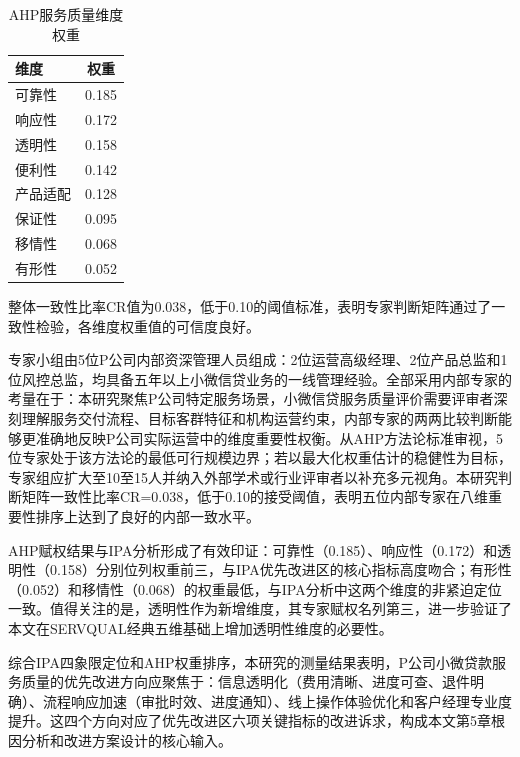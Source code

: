 \begin{table}[htbp]
  \centering
  \small
  \caption{AHP服务质量维度权重}
  \label{tab:4-ahp}
  \begin{tabular}{l c}
    \toprule
    \textbf{维度} & \textbf{权重} \\
    \midrule
    可靠性 & 0.185 \\
    响应性 & 0.172 \\
    透明性 & 0.158 \\
    便利性 & 0.142 \\
    产品适配 & 0.128 \\
    保证性 & 0.095 \\
    移情性 & 0.068 \\
    有形性 & 0.052 \\
    \bottomrule
  \end{tabular}
\end{table}

整体一致性比率CR值为0.038，低于0.10的阈值标准，表明专家判断矩阵通过了一致性检验，各维度权重值的可信度良好。\par

专家小组由5位P公司内部资深管理人员组成：2位运营高级经理、2位产品总监和1位风控总监，均具备五年以上小微信贷业务的一线管理经验。全部采用内部专家的考量在于：本研究聚焦P公司特定服务场景，小微信贷服务质量评价需要评审者深刻理解服务交付流程、目标客群特征和机构运营约束，内部专家的两两比较判断能够更准确地反映P公司实际运营中的维度重要性权衡。从AHP方法论标准审视，5位专家处于该方法论的最低可行规模边界\cite{ref41,ref63}；若以最大化权重估计的稳健性为目标，专家组应扩大至10至15人并纳入外部学术或行业评审者以补充多元视角。本研究判断矩阵一致性比率CR=0.038，低于0.10的接受阈值，表明五位内部专家在八维重要性排序上达到了良好的内部一致水平。\par

AHP赋权结果与IPA分析形成了有效印证：可靠性（0.185）、响应性（0.172）和透明性（0.158）分别位列权重前三，与IPA优先改进区的核心指标高度吻合；有形性（0.052）和移情性（0.068）的权重最低，与IPA分析中这两个维度的非紧迫定位一致。值得关注的是，透明性作为新增维度，其专家赋权名列第三，进一步验证了本文在SERVQUAL经典五维基础上增加透明性维度的必要性。\par

综合IPA四象限定位和AHP权重排序，本研究的测量结果表明，P公司小微贷款服务质量的优先改进方向应聚焦于：信息透明化（费用清晰、进度可查、退件明确）、流程响应加速（审批时效、进度通知）、线上操作体验优化和客户经理专业度提升。这四个方向对应了优先改进区六项关键指标的改进诉求，构成本文第5章根因分析和改进方案设计的核心输入。\par

